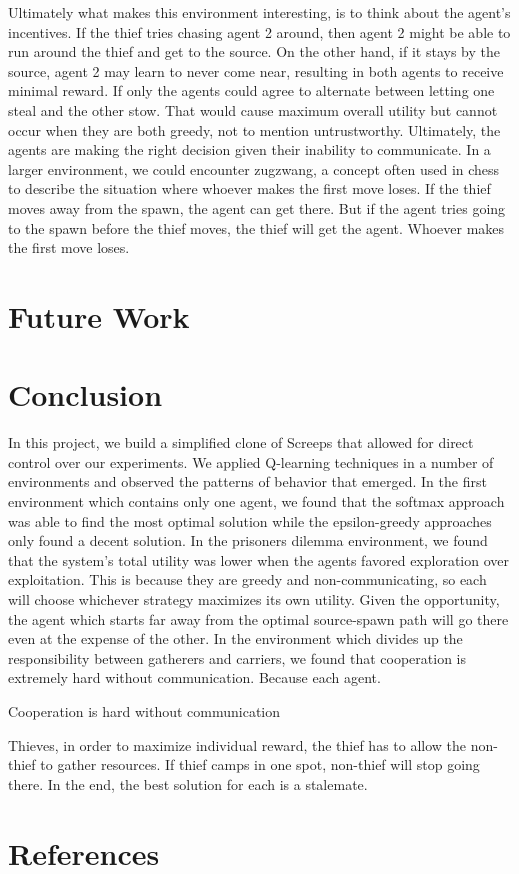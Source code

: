 \documentclass[11pt]{article}
\begin{document}
Ultimately what makes this environment interesting, is to think about the agent's incentives. If the thief tries chasing agent 2 around, then agent 2 might be able to run around the thief and get to the source. On the other hand, if it stays by the source, agent 2 may learn to never come near, resulting in both agents to receive minimal reward. If only the agents could agree to alternate between letting one steal and the other stow. That would cause maximum overall utility but cannot occur when they are both greedy, not to mention untrustworthy. Ultimately, the agents are making the right decision given their inability to communicate. In a larger environment, we could encounter zugzwang, a concept often used in chess to describe the situation where whoever makes the first move loses. If the thief moves away from the spawn, the agent can get there. But if the agent tries going to the spawn before the thief moves, the thief will get the agent. Whoever makes the first move loses.

\section{Future Work}

\section{Conclusion}

	In this project, we build a simplified clone of Screeps that allowed for direct control over our experiments. We applied Q-learning techniques in a number of environments and observed the patterns of behavior that emerged. In the first environment which contains only one agent, we found that the softmax approach was able to find the most optimal solution while the epsilon-greedy approaches only found a decent solution. In the prisoners dilemma environment, we found that the system's total utility was lower when the agents favored exploration over exploitation. This is because they are greedy and non-communicating, so each will choose whichever strategy maximizes its own utility. Given the opportunity, the agent which starts far away from the optimal source-spawn path will go there even at the expense of the other. 
	In the environment which divides up the responsibility between gatherers and carriers, we found that cooperation is extremely hard without communication. Because each agent.

Cooperation is hard without communication


Thieves, in order to maximize individual reward, the thief has to allow the non-thief to gather resources. If thief camps in one spot, non-thief will stop going there. In the end, the best solution for each is a stalemate.

\section{References}
\end{document}
